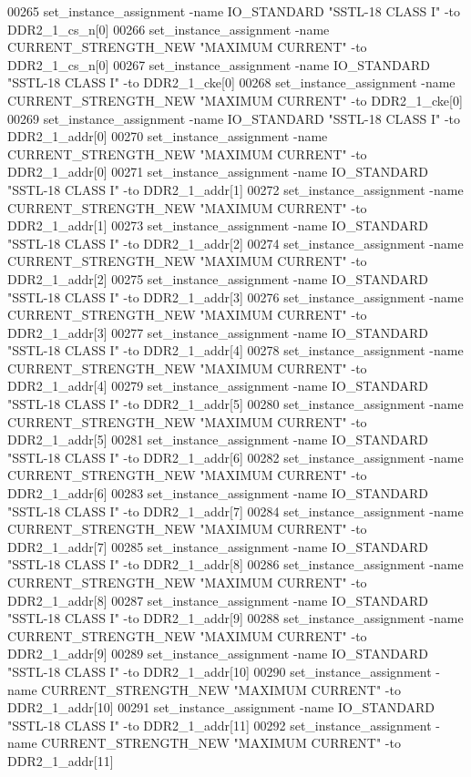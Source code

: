 \begin{DoxyCode}
00265 set\_instance\_assignment -name IO\_STANDARD "SSTL-18 CLASS I" -to DDR2\_1\_cs\_n[0]
00266 set\_instance\_assignment -name CURRENT\_STRENGTH\_NEW "MAXIMUM CURRENT" -to DDR2\_1\_cs\_n[0]
00267 set\_instance\_assignment -name IO\_STANDARD "SSTL-18 CLASS I" -to DDR2\_1\_cke[0]
00268 set\_instance\_assignment -name CURRENT\_STRENGTH\_NEW "MAXIMUM CURRENT" -to DDR2\_1\_cke[0]
00269 set\_instance\_assignment -name IO\_STANDARD "SSTL-18 CLASS I" -to DDR2\_1\_addr[0]
00270 set\_instance\_assignment -name CURRENT\_STRENGTH\_NEW "MAXIMUM CURRENT" -to DDR2\_1\_addr[0]
00271 set\_instance\_assignment -name IO\_STANDARD "SSTL-18 CLASS I" -to DDR2\_1\_addr[1]
00272 set\_instance\_assignment -name CURRENT\_STRENGTH\_NEW "MAXIMUM CURRENT" -to DDR2\_1\_addr[1]
00273 set\_instance\_assignment -name IO\_STANDARD "SSTL-18 CLASS I" -to DDR2\_1\_addr[2]
00274 set\_instance\_assignment -name CURRENT\_STRENGTH\_NEW "MAXIMUM CURRENT" -to DDR2\_1\_addr[2]
00275 set\_instance\_assignment -name IO\_STANDARD "SSTL-18 CLASS I" -to DDR2\_1\_addr[3]
00276 set\_instance\_assignment -name CURRENT\_STRENGTH\_NEW "MAXIMUM CURRENT" -to DDR2\_1\_addr[3]
00277 set\_instance\_assignment -name IO\_STANDARD "SSTL-18 CLASS I" -to DDR2\_1\_addr[4]
00278 set\_instance\_assignment -name CURRENT\_STRENGTH\_NEW "MAXIMUM CURRENT" -to DDR2\_1\_addr[4]
00279 set\_instance\_assignment -name IO\_STANDARD "SSTL-18 CLASS I" -to DDR2\_1\_addr[5]
00280 set\_instance\_assignment -name CURRENT\_STRENGTH\_NEW "MAXIMUM CURRENT" -to DDR2\_1\_addr[5]
00281 set\_instance\_assignment -name IO\_STANDARD "SSTL-18 CLASS I" -to DDR2\_1\_addr[6]
00282 set\_instance\_assignment -name CURRENT\_STRENGTH\_NEW "MAXIMUM CURRENT" -to DDR2\_1\_addr[6]
00283 set\_instance\_assignment -name IO\_STANDARD "SSTL-18 CLASS I" -to DDR2\_1\_addr[7]
00284 set\_instance\_assignment -name CURRENT\_STRENGTH\_NEW "MAXIMUM CURRENT" -to DDR2\_1\_addr[7]
00285 set\_instance\_assignment -name IO\_STANDARD "SSTL-18 CLASS I" -to DDR2\_1\_addr[8]
00286 set\_instance\_assignment -name CURRENT\_STRENGTH\_NEW "MAXIMUM CURRENT" -to DDR2\_1\_addr[8]
00287 set\_instance\_assignment -name IO\_STANDARD "SSTL-18 CLASS I" -to DDR2\_1\_addr[9]
00288 set\_instance\_assignment -name CURRENT\_STRENGTH\_NEW "MAXIMUM CURRENT" -to DDR2\_1\_addr[9]
00289 set\_instance\_assignment -name IO\_STANDARD "SSTL-18 CLASS I" -to DDR2\_1\_addr[10]
00290 set\_instance\_assignment -name CURRENT\_STRENGTH\_NEW "MAXIMUM CURRENT" -to DDR2\_1\_addr[10]
00291 set\_instance\_assignment -name IO\_STANDARD "SSTL-18 CLASS I" -to DDR2\_1\_addr[11]
00292 set\_instance\_assignment -name CURRENT\_STRENGTH\_NEW "MAXIMUM CURRENT" -to DDR2\_1\_addr[11]

\end{DoxyCode}
